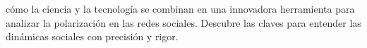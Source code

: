 \documentclass[preview]{standalone}
\begin{document}
\begin{center}
\justifying cómo la ciencia y la tecnología se combinan en una innovadora herramienta para analizar la polarización en las redes sociales. Descubre las claves para entender las dinámicas sociales con precisión y rigor.
\end{center}
\end{document}
